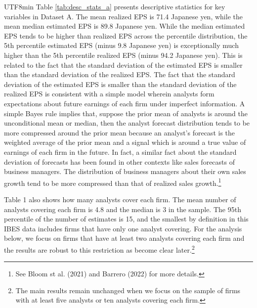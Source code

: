 \documentclass[12pt, a4paper]{article}
\begin{document}
\begin{CJK}{UTF8}{min}
Table \ref{tab:desc_stats_a} presents descriptive statistics for key variables in Dataset A.
The mean realized EPS is 71.4 Japanese yen, while the mean median estimated EPS is 89.8 Japanese yen.
While the median estimated EPS tends to be higher than realized EPS across the percentile distribution,
the 5th percentile estimated EPS (minus 9.8 Japanese yen) is exceptionally much higher than the 5th percentile realized EPS (minus 94.2 Japanese yen).
This is related to the fact that the standard deviation of the estimated EPS is smaller than the standard deviation of the realized EPS.
The fact that the standard deviation of the estimated EPS is smaller than the standard deviation of the realized EPS is consistent with 
a simple model wherein analysts form expectations about future earnings of each firm under imperfect information.
A simple Bayes rule implies that, suppose the prior mean of analysts is around the unconditional mean or median, then the analyst forecast distribution 
tends to be more compressed around the prior mean because an analyst's forecast is the weighted average of the prior mean and a signal 
which is around a true value of earnings of each firm in the future. 
In fact, a similar fact about the standard deviation of forecasts has been found in other contexts like sales forecasts of business managers. 
The distribution of business managers about their own sales growth tend to be more compressed than that of 
realized sales growth.\footnote{See Bloom st al. (2021) and Barrero (2022) for more details.}

Table 1 also shows how many analysts cover each firm. 
The mean number of analysts covering each firm is 4.8 and the median is 3 in the sample. 
The 95th percentile of the number of estimates is 15, and the smallest by definition in this IBES data includes firms that have only one analyst covering.
For the analysis below, we focus on firms that have at least two analysts covering each firm and the results are robust to this restriction as become clear 
later.\footnote{The main results remain unchanged when we focus on the sample of firms with at least five analysts or ten analysts covering each firm.}

\begin{table}[htbp]
\centering
\resizebox{1.0\textwidth}{!}{
\begin{threeparttable}

\begin{tablenotes}
\footnotesize
\item
\end{tablenotes}
\end{threeparttable}
}
\caption{Descriptive Statistics: Dataset B}
\label{tab:desc_stats_b}
\end{table}



\end{CJK}
\end{document}
